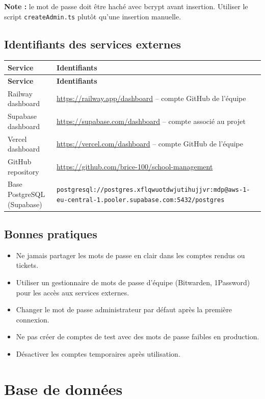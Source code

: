 \documentclass[12pt,a4paper]{report}
\begin{document}
\textbf{Note :} le mot de passe doit être haché avec bcrypt avant insertion. Utiliser le script \texttt{createAdmin.ts} plutôt qu'une insertion manuelle.

\section{Identifiants des services externes}

\begin{longtable}{|p{4cm}|p{10.5cm}|}
\hline
\textbf{Service} & \textbf{Identifiants} \\
\hline
\endfirsthead
\hline
\textbf{Service} & \textbf{Identifiants} \\
\hline
\endhead
Railway dashboard & \url{https://railway.app/dashboard} -- compte GitHub de l'équipe \\
\hline
Supabase dashboard & \url{https://supabase.com/dashboard} -- compte associé au projet \\
\hline
Vercel dashboard & \url{https://vercel.com/dashboard} -- compte GitHub de l'équipe \\
\hline
GitHub repository & \url{https://github.com/brice-100/school-management} \\
\hline
Base PostgreSQL (Supabase) & \texttt{postgresql://postgres.xflqwuotdwjutihujjvr:mdp@aws-1-eu-central-1.pooler.supabase.com:5432/postgres} \\
\hline
\end{longtable}

\section{Bonnes pratiques}
\begin{itemize}
    \item Ne jamais partager les mots de passe en clair dans les comptes rendus ou tickets.
    \item Utiliser un gestionnaire de mots de passe d'équipe (Bitwarden, 1Password) pour les accès aux services externes.
    \item Changer le mot de passe administrateur par défaut après la première connexion.
    \item Ne pas créer de comptes de test avec des mots de passe faibles en production.
    \item Désactiver les comptes temporaires après utilisation.
\end{itemize}

\chapter{Base de données}
\end{document}
